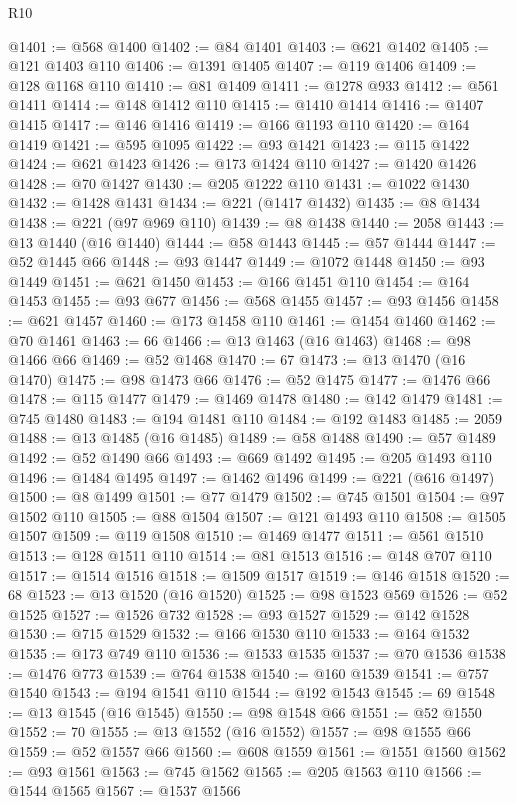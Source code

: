 \begin{lexlean}{R10}
\begin{coremodule}
@1401 := @568 @1400
@1402 := @84 @1401
@1403 := @621 @1402
@1405 := @121 @1403 @110
@1406 := @1391 @1405
@1407 := @119 @1406
@1409 := @128 @1168 @110
@1410 := @81 @1409
@1411 := @1278 @933
@1412 := @561 @1411
@1414 := @148 @1412 @110
@1415 := @1410 @1414
@1416 := @1407 @1415
@1417 := @146 @1416
@1419 := @166 @1193 @110
@1420 := @164 @1419
@1421 := @595 @1095
@1422 := @93 @1421
@1423 := @115 @1422
@1424 := @621 @1423
@1426 := @173 @1424 @110
@1427 := @1420 @1426
@1428 := @70 @1427
@1430 := @205 @1222 @110
@1431 := @1022 @1430
@1432 := @1428 @1431
@1434 := @221 (@1417 @1432)
@1435 := @8 @1434
@1438 := @221 (@97 @969 @110)
@1439 := @8 @1438
@1440 := 2058
@1443 := @13 @1440 (@16 @1440)
@1444 := @58 @1443
@1445 := @57 @1444
@1447 := @52 @1445 @66
@1448 := @93 @1447
@1449 := @1072 @1448
@1450 := @93 @1449
@1451 := @621 @1450
@1453 := @166 @1451 @110
@1454 := @164 @1453
@1455 := @93 @677
@1456 := @568 @1455
@1457 := @93 @1456
@1458 := @621 @1457
@1460 := @173 @1458 @110
@1461 := @1454 @1460
@1462 := @70 @1461
@1463 := 66
@1466 := @13 @1463 (@16 @1463)
@1468 := @98 @1466 @66
@1469 := @52 @1468
@1470 := 67
@1473 := @13 @1470 (@16 @1470)
@1475 := @98 @1473 @66
@1476 := @52 @1475
@1477 := @1476 @66
@1478 := @115 @1477
@1479 := @1469 @1478
@1480 := @142 @1479
@1481 := @745 @1480
@1483 := @194 @1481 @110
@1484 := @192 @1483
@1485 := 2059
@1488 := @13 @1485 (@16 @1485)
@1489 := @58 @1488
@1490 := @57 @1489
@1492 := @52 @1490 @66
@1493 := @669 @1492
@1495 := @205 @1493 @110
@1496 := @1484 @1495
@1497 := @1462 @1496
@1499 := @221 (@616 @1497)
@1500 := @8 @1499
@1501 := @77 @1479
@1502 := @745 @1501
@1504 := @97 @1502 @110
@1505 := @88 @1504
@1507 := @121 @1493 @110
@1508 := @1505 @1507
@1509 := @119 @1508
@1510 := @1469 @1477
@1511 := @561 @1510
@1513 := @128 @1511 @110
@1514 := @81 @1513
@1516 := @148 @707 @110
@1517 := @1514 @1516
@1518 := @1509 @1517
@1519 := @146 @1518
@1520 := 68
@1523 := @13 @1520 (@16 @1520)
@1525 := @98 @1523 @569
@1526 := @52 @1525
@1527 := @1526 @732
@1528 := @93 @1527
@1529 := @142 @1528
@1530 := @715 @1529
@1532 := @166 @1530 @110
@1533 := @164 @1532
@1535 := @173 @749 @110
@1536 := @1533 @1535
@1537 := @70 @1536
@1538 := @1476 @773
@1539 := @764 @1538
@1540 := @160 @1539
@1541 := @757 @1540
@1543 := @194 @1541 @110
@1544 := @192 @1543
@1545 := 69
@1548 := @13 @1545 (@16 @1545)
@1550 := @98 @1548 @66
@1551 := @52 @1550
@1552 := 70
@1555 := @13 @1552 (@16 @1552)
@1557 := @98 @1555 @66
@1559 := @52 @1557 @66
@1560 := @608 @1559
@1561 := @1551 @1560
@1562 := @93 @1561
@1563 := @745 @1562
@1565 := @205 @1563 @110
@1566 := @1544 @1565
@1567 := @1537 @1566

\end{coremodule}
\end{lexlean}
